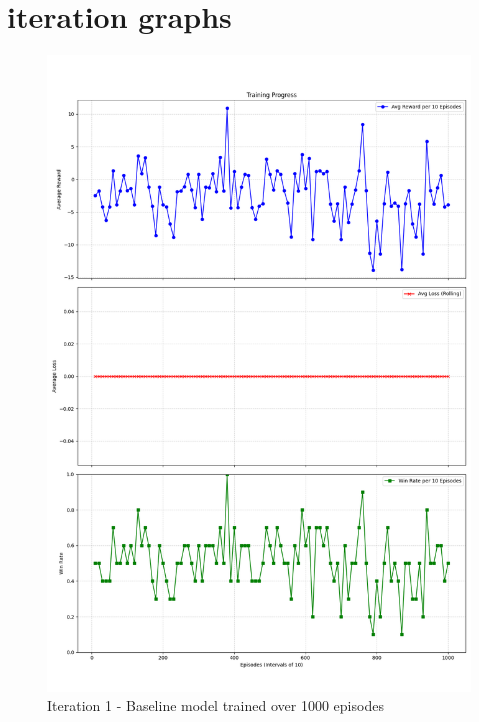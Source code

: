 \section{iteration graphs}
\label{appendix:iteration-graphs}

\begin{figure}[H]
    \includegraphics[width=.8\textwidth]{assets/Iteration-1-graphs.png}
    \caption{Iteration 1 - Baseline model trained over 1000 episodes}
    \label{fig:iteration-1-graphs}
\end{figure}

